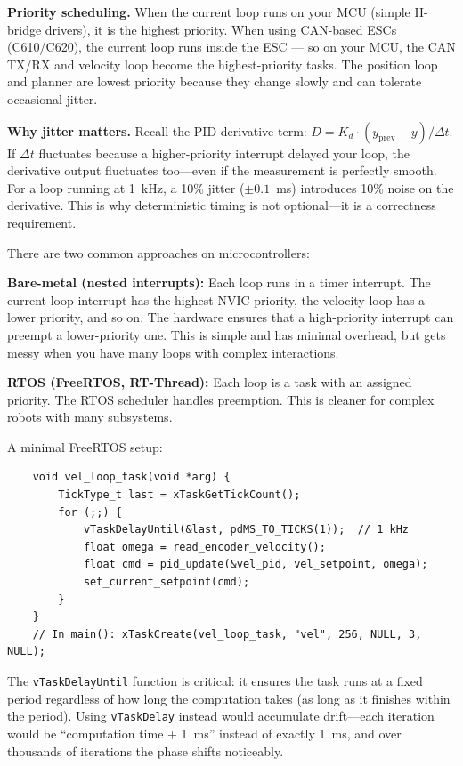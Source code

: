 \textbf{Priority scheduling.} When the current loop runs on your MCU (simple H-bridge drivers), it is the highest priority. When using CAN-based ESCs (C610/C620), the current loop runs inside the ESC --- so on your MCU, the CAN TX/RX and velocity loop become the highest-priority tasks. The position loop and planner are lowest priority because they change slowly and can tolerate occasional jitter.

\textbf{Why jitter matters.} Recall the PID derivative term: $D = K_d \cdot (y_{\text{prev}} - y) / \Delta t$. If $\Delta t$ fluctuates because a higher-priority interrupt delayed your loop, the derivative output fluctuates too---even if the measurement is perfectly smooth. For a loop running at 1~kHz, a 10\% jitter ($\pm 0.1$~ms) introduces 10\% noise on the derivative. This is why deterministic timing is not optional---it is a correctness requirement.

There are two common approaches on microcontrollers:

\textbf{Bare-metal (nested interrupts):} Each loop runs in a timer interrupt. The current loop interrupt has the highest NVIC priority, the velocity loop has a lower priority, and so on. The hardware ensures that a high-priority interrupt can preempt a lower-priority one. This is simple and has minimal overhead, but gets messy when you have many loops with complex interactions.

\textbf{RTOS (FreeRTOS, RT-Thread):} Each loop is a task with an assigned priority. The RTOS scheduler handles preemption. This is cleaner for complex robots with many subsystems.

A minimal FreeRTOS setup:

\begin{verbatim}
    void vel_loop_task(void *arg) {
        TickType_t last = xTaskGetTickCount();
        for (;;) {
            vTaskDelayUntil(&last, pdMS_TO_TICKS(1));  // 1 kHz
            float omega = read_encoder_velocity();
            float cmd = pid_update(&vel_pid, vel_setpoint, omega);
            set_current_setpoint(cmd);
        }
    }
    // In main(): xTaskCreate(vel_loop_task, "vel", 256, NULL, 3, NULL);
\end{verbatim}

The \texttt{vTaskDelayUntil} function is critical: it ensures the task runs at a fixed period regardless of how long the computation takes (as long as it finishes within the period). Using \texttt{vTaskDelay} instead would accumulate drift---each iteration would be ``computation time + 1~ms'' instead of exactly 1~ms, and over thousands of iterations the phase shifts noticeably.

